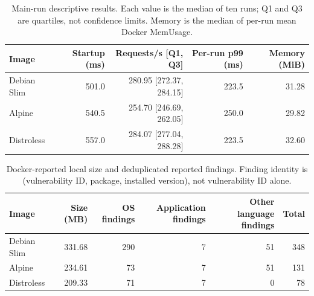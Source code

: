 \begin{table}[t]
\centering
\caption{Main-run descriptive results. Each value is the median of ten runs; Q1 and Q3 are quartiles, not confidence limits. Memory is the median of per-run mean Docker MemUsage.}
\label{tab:performance}
\small
\begin{tabular}{lrrrr}
\toprule
Image & Startup (ms) & Requests/s [Q1, Q3] & Per-run p99 (ms) & Memory (MiB) \\
\midrule
Debian Slim & 501.0 & 280.95 [272.37, 284.15] & 223.5 & 31.28 \\
Alpine & 540.5 & 254.70 [246.69, 262.05] & 250.0 & 29.82 \\
Distroless & 557.0 & 284.07 [277.04, 288.28] & 223.5 & 32.60 \\
\bottomrule
\end{tabular}
\end{table}

\begin{table}[t]
\centering
\caption{Docker-reported local size and deduplicated reported findings. Finding identity is (vulnerability ID, package, installed version), not vulnerability ID alone.}
\label{tab:security}
\small
\begin{tabular}{lrrrrr}
\toprule
Image & Size (MB) & OS findings & Application findings & Other language findings & Total \\
\midrule
Debian Slim & 331.68 & 290 & 7 & 51 & 348 \\
Alpine & 234.61 & 73 & 7 & 51 & 131 \\
Distroless & 209.33 & 71 & 7 & 0 & 78 \\
\bottomrule
\end{tabular}
\end{table}

